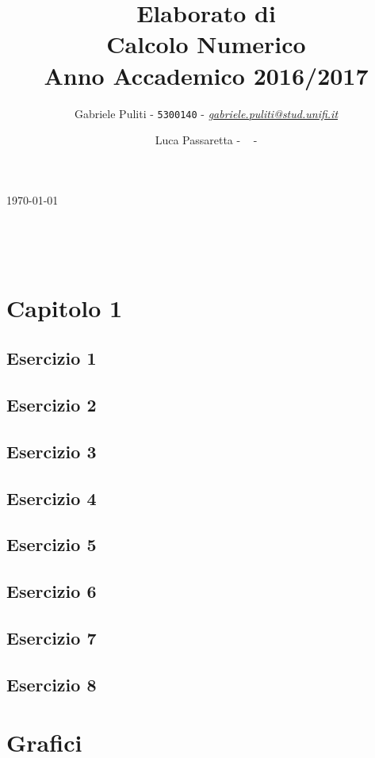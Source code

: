 \documentclass[11pt]{extarticle}
\title{\vspace{2cm}Elaborato di\\ \textbf{Calcolo Numerico}\\ Anno Accademico 2016/2017\vspace{1cm}}
\author{Gabriele Puliti - \texttt{5300140} - \href{mailto:gabriele.puliti@stud.unifi.it}{\textit{gabriele.puliti@stud.unifi.it}}
\and Luca Passaretta - \texttt{ } - \href{mailto: }{\textit{ }}}
\date{}
\begin{document}
\maketitle

\begin{center}
\today{}
\end{center}

\
\newpage

\tableofcontents
\
\newpage

\section{\textbf{Capitolo 1}}
\subsection{Esercizio 1}

\subsection{Esercizio 2}

\subsection{Esercizio 3}

\subsection{Esercizio 4}

\subsection{Esercizio 5}

\subsection{Esercizio 6}

\subsection{Esercizio 7}

\subsection{Esercizio 8}


\newpage
{}
\section{\textbf{Grafici}}
\end{document}

